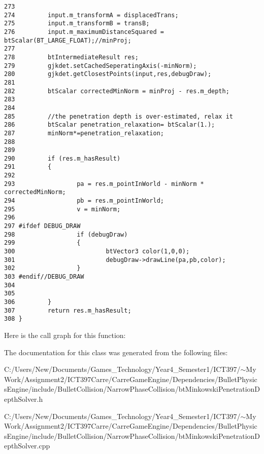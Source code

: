 \begin{Code}
\begin{verbatim}
273 
274         input.m_transformA = displacedTrans;
275         input.m_transformB = transB;
276         input.m_maximumDistanceSquared = btScalar(BT_LARGE_FLOAT);//minProj;
277         
278         btIntermediateResult res;
279         gjkdet.setCachedSeperatingAxis(-minNorm);
280         gjkdet.getClosestPoints(input,res,debugDraw);
281 
282         btScalar correctedMinNorm = minProj - res.m_depth;
283 
284 
285         //the penetration depth is over-estimated, relax it
286         btScalar penetration_relaxation= btScalar(1.);
287         minNorm*=penetration_relaxation;
288         
289 
290         if (res.m_hasResult)
291         {
292 
293                 pa = res.m_pointInWorld - minNorm * correctedMinNorm;
294                 pb = res.m_pointInWorld;
295                 v = minNorm;
296                 
297 #ifdef DEBUG_DRAW
298                 if (debugDraw)
299                 {
300                         btVector3 color(1,0,0);
301                         debugDraw->drawLine(pa,pb,color);
302                 }
303 #endif//DEBUG_DRAW
304 
305 
306         }
307         return res.m_hasResult;
308 }
\end{verbatim}
\end{Code}




Here is the call graph for this function:

The documentation for this class was generated from the following files:\begin{CompactItemize}
\item 
C:/Users/New/Documents/Games\_\-Technology/Year4\_\-Semester1/ICT397/$\sim$My Work/Assignment2/ICT397Carre/CarreGameEngine/Dependencies/BulletPhysicsEngine/include/BulletCollision/NarrowPhaseCollision/btMinkowskiPenetrationDepthSolver.h\item 
C:/Users/New/Documents/Games\_\-Technology/Year4\_\-Semester1/ICT397/$\sim$My Work/Assignment2/ICT397Carre/CarreGameEngine/Dependencies/BulletPhysicsEngine/include/BulletCollision/NarrowPhaseCollision/btMinkowskiPenetrationDepthSolver.cpp\end{CompactItemize}
